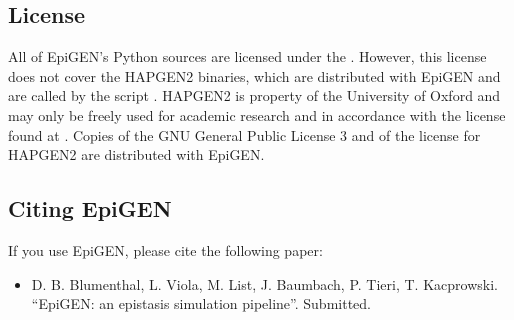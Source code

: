 \documentclass[a4paper,10pt,english]{sphinxhowto}
\begin{document}
\subsection{License}
\label{\detokenize{README:license}}
All of EpiGEN’s Python sources are licensed under the . However, this license does not cover the HAPGEN2 binaries, which are distributed with EpiGEN and are called by the script . HAPGEN2 is property of the University of Oxford and may only be freely used for academic research and in accordance with the license found at . Copies of the GNU General Public License 3 and of the license for HAPGEN2 are distributed with EpiGEN.


\subsection{Citing EpiGEN}
\label{\detokenize{README:citing-epigen}}
If you use EpiGEN, please cite the following paper:
\begin{itemize}
\item {} 
D. B. Blumenthal, L. Viola, M. List, J. Baumbach, P. Tieri, T. Kacprowski. “EpiGEN: an epistasis simulation pipeline”. Submitted.

\end{itemize}
\end{document}
